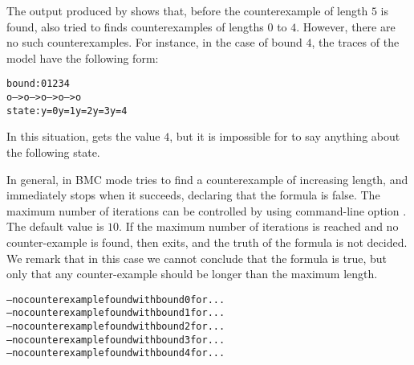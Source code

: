 The output produced by \nusmv shows that, before the counterexample
of length $5$ is found, \nusmv also tried to finds counterexamples of
lengths $0$ to $4$. However, there are no such
counterexamples. For instance, in the case of bound $4$, the traces of the
model have the following form:
\begin{alltt}
 bound:   0    1    2    3    4   
          o--->o--->o--->o--->o
 state:  y=0  y=1  y=2  y=3  y=4  
\end{alltt}
In this situation,  gets the value $4$, but it is impossible for
\nusmv to say anything about the following state.

In general, in BMC mode \nusmv tries to find a counterexample of
increasing length, and immediately stops when it succeeds, declaring
that the formula is false. The maximum number of iterations can be
controlled by using command-line option .  The default
value is $10$. 
If the maximum number of iterations is reached and no counter-example is
found, then \nusmv exits, and the truth of the formula is not
decided. We remark that in this case we cannot conclude that the formula is true,
but only that any counter-example should be longer than the maximum length.
\begin{alltt}
\shellprompt {}
-- no counterexample found with bound 0 for ...
-- no counterexample found with bound 1 for ...
-- no counterexample found with bound 2 for ...
-- no counterexample found with bound 3 for ...
-- no counterexample found with bound 4 for ...
\shellprompt 
\end{alltt}

